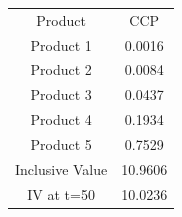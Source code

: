 \begin{tabular}{cc}
Product & CCP \\
Product 1 & 0.0016 \\
Product 2 & 0.0084 \\
Product 3 & 0.0437 \\
Product 4 & 0.1934 \\
Product 5 & 0.7529 \\
Inclusive Value & 10.9606 \\
IV at t=50 & 10.0236 \\
\end{tabular}